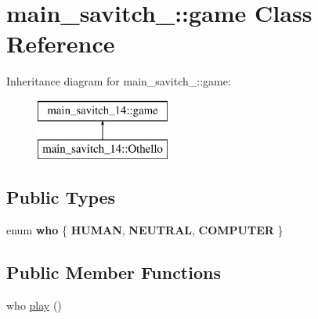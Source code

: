 \hypertarget{classmain__savitch__14_1_1game}{}\section{main\+\_\+savitch\+\_\+:\+:game Class Reference}
\label{classmain__savitch__14_1_1game}
Inheritance diagram for main\+\_\+savitch\+\_\+:\+:game\+:\begin{figure}[H]
\begin{center}
\leavevmode
\includegraphics[height=2.000000cm]{classmain__savitch__14_1_1game}
\end{center}
\end{figure}
\subsection*{Public Types}
\begin{DoxyCompactItemize}
\item 
\mbox{\label{classmain__savitch__14_1_1game_a4fe20fb287f809ae2b68e28e4ccba634}} 
enum {\bfseries who} \{ {\bfseries H\+U\+M\+AN}, 
{\bfseries N\+E\+U\+T\+R\+AL}, 
{\bfseries C\+O\+M\+P\+U\+T\+ER}
 \}
\end{DoxyCompactItemize}
\subsection*{Public Member Functions}
\begin{DoxyCompactItemize}
\item 
who \mbox{\hyperlink{classmain__savitch__14_1_1game_a4dbeaddb78059f7c5dcbf5cc4e026317}{play}} ()
\end{DoxyCompactItemize}
